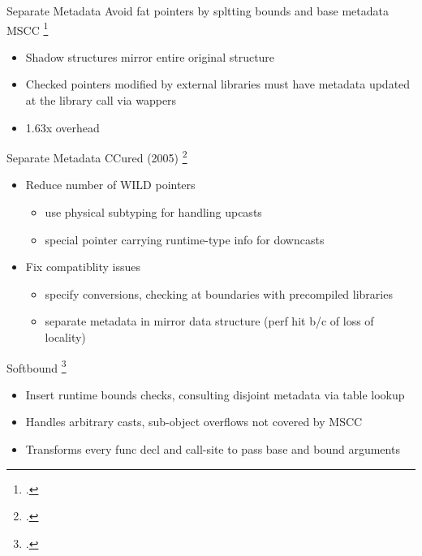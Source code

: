 \documentclass[aspectratio=169]{beamer}
\begin{document}

\begin{frame}[fragile]{Separate Metadata}
Avoid fat pointers by spltting bounds and base metadata
\\
MSCC \footcite{xu_efficient_2004}
    \begin{itemize}
        \item Shadow structures mirror entire original structure
        \item Checked pointers modified by external libraries must have metadata updated at the library call via wappers
        \item 1.63x overhead
    \end{itemize}
\end{frame}

\begin{frame}{Separate Metadata}
CCured (2005) \footcite{necula_ccured:_2005} %
    \begin{itemize}
        \item Reduce number of WILD pointers
            \begin{itemize}
                \item use physical subtyping for handling upcasts
                \item special pointer carrying runtime-type info for downcasts
            \end{itemize}
        \item Fix compatiblity issues
            \begin{itemize}
                \item specify conversions, checking at boundaries with precompiled libraries
                \item separate metadata in mirror data structure (perf hit b/c of loss of locality)
            \end{itemize}
    \end{itemize}
Softbound \footcite{nagarakatte_softbound:_2009}
    \begin{itemize}
        \item Insert runtime bounds checks, consulting disjoint metadata via table lookup
        \item Handles arbitrary casts, sub-object overflows not covered by MSCC
        \item Transforms every func decl and call-site to pass base and bound arguments %
    \end{itemize}
\vspace{0.2in}
\end{frame}
\end{document}

